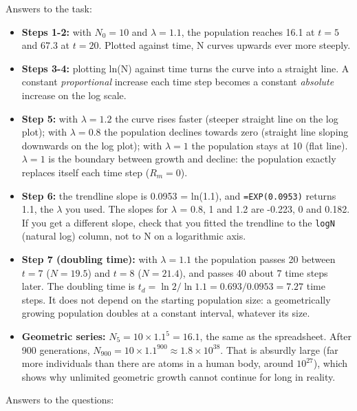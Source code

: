 \documentclass[
  a4paper]{book}
\providecommand{\tightlist}{%
  \setlength{\itemsep}{0pt}\setlength{\parskip}{0pt}}
\begin{document}
Answers to the task:

\begin{itemize}
\tightlist
\item
  \textbf{Steps 1-2:} with \(N_0 = 10\) and \(\lambda = 1.1\), the population reaches 16.1 at \(t = 5\) and 67.3 at \(t = 20\). Plotted against time, N curves upwards ever more steeply.
\item
  \textbf{Steps 3-4:} plotting ln(N) against time turns the curve into a straight line. A constant \emph{proportional} increase each time step becomes a constant \emph{absolute} increase on the log scale.
\item
  \textbf{Step 5:} with \(\lambda = 1.2\) the curve rises faster (steeper straight line on the log plot); with \(\lambda = 0.8\) the population declines towards zero (straight line sloping downwards on the log plot); with \(\lambda = 1\) the population stays at 10 (flat line). \(\lambda = 1\) is the boundary between growth and decline: the population exactly replaces itself each time step (\(R_m = 0\)).
\item
  \textbf{Step 6:} the trendline slope is 0.0953 = ln(1.1), and \texttt{=EXP(0.0953)} returns 1.1, the \(\lambda\) you used. The slopes for \(\lambda\) = 0.8, 1 and 1.2 are -0.223, 0 and 0.182. If you get a different slope, check that you fitted the trendline to the \texttt{logN} (natural log) column, not to N on a logarithmic axis.
\item
  \textbf{Step 7 (doubling time):} with \(\lambda = 1.1\) the population passes 20 between \(t = 7\) (\(N = 19.5\)) and \(t = 8\) (\(N = 21.4\)), and passes 40 about 7 time steps later. The doubling time is \(t_d = \ln 2 / \ln 1.1 = 0.693/0.0953 = 7.27\) time steps. It does not depend on the starting population size: a geometrically growing population doubles at a constant interval, whatever its size.
\item
  \textbf{Geometric series:} \(N_5 = 10 \times 1.1^5 = 16.1\), the same as the spreadsheet. After 900 generations, \(N_{900} = 10 \times 1.1^{900} \approx 1.8 \times 10^{38}\). That is absurdly large (far more individuals than there are atoms in a human body, around \(10^{27}\)), which shows why unlimited geometric growth cannot continue for long in reality.
\end{itemize}

Answers to the questions:
\end{document}
